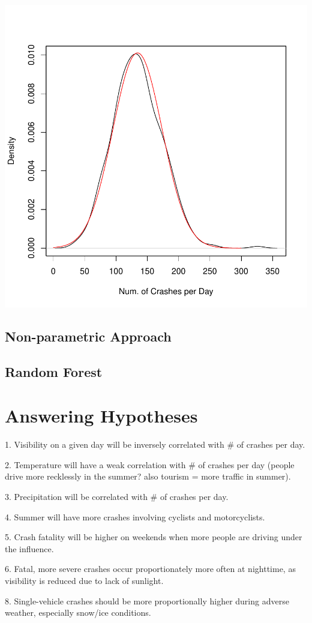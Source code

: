 \documentclass[11pt, a4paper]{article}
\begin{document}
\includegraphics{regression-005}



\pagebreak
\subsection{Non-parametric Approach}




\pagebreak
\subsection{Random Forest}







\pagebreak
\section{Answering Hypotheses}


1. Visibility on a given day will be inversely correlated with \# of crashes per day.

2. Temperature will have a weak correlation with \# of crashes per day (people drive more recklessly in the summer? also tourism = more traffic in summer). 

3. Precipitation will be correlated with \# of crashes per day. 

4. Summer will have more crashes involving cyclists and motorcyclists. 

5. Crash fatality will be higher on weekends when more people are driving under the influence. 

6. Fatal, more severe crashes occur proportionately more often at nighttime, as visibility is reduced due to lack of sunlight. 

8. Single-vehicle crashes should be more proportionally higher during adverse weather, especially snow/ice conditions. 
\end{document}
